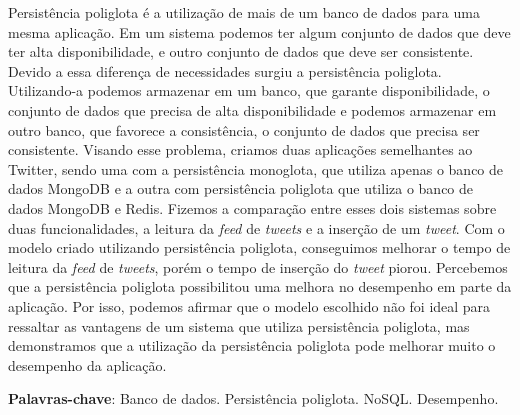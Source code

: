 %
%

\begin{resumo}

Persistência poliglota é a utilização de mais de um banco de dados para uma mesma aplicação. Em um sistema podemos ter algum conjunto de dados que deve ter alta disponibilidade, e outro conjunto de dados que deve ser consistente. Devido a essa diferença de necessidades surgiu a persistência poliglota. Utilizando-a podemos armazenar em um banco, que garante disponibilidade, o conjunto de dados que precisa de alta disponibilidade e podemos armazenar em outro banco, que favorece a consistência, o conjunto de dados que precisa ser consistente. Visando esse problema, criamos duas aplicações semelhantes ao Twitter, sendo uma com a persistência monoglota, que utiliza apenas o banco de dados MongoDB e a outra com persistência poliglota que utiliza o banco de dados MongoDB e Redis. Fizemos a comparação entre esses dois sistemas sobre duas funcionalidades, a leitura da \textit{feed} de \textit{tweets} e a inserção de um \textit{tweet}. Com o modelo criado utilizando persistência poliglota, conseguimos melhorar o tempo de leitura da \textit{feed} de \textit{tweets}, porém o tempo de inserção do \textit{tweet} piorou. Percebemos que a persistência poliglota possibilitou uma melhora no desempenho em parte da aplicação. Por isso, podemos afirmar que o modelo escolhido não foi ideal para ressaltar as vantagens de um sistema que utiliza persistência poliglota, mas demonstramos que a utilização da persistência poliglota pode melhorar muito o desempenho da aplicação.


\textbf{Palavras-chave}: Banco de dados. Persistência poliglota. NoSQL. Desempenho. 

\end{resumo}